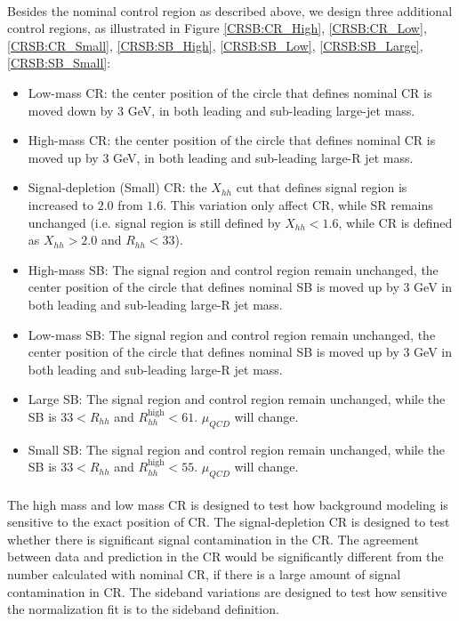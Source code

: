 \paragraph{}
Besides the nominal control region as described above, we design three additional control regions, as illustrated in Figure \ref{CRSB:CR_High}, \ref{CRSB:CR_Low}, \ref{CRSB:CR_Small}, \ref{CRSB:SB_High}, \ref{CRSB:SB_Low}, \ref{CRSB:SB_Large}, \ref{CRSB:SB_Small}:
\begin{itemize}
	\item Low-mass CR: the center position of the circle that defines nominal CR is moved down by 3 GeV, in both leading and sub-leading large-jet mass.
	\item High-mass CR: the center position of the circle that defines nominal CR is moved up by 3 GeV, in both leading and sub-leading large-R jet mass.
	\item Signal-depletion (Small) CR: the $X_{hh}$ cut that defines signal region is increased to $2.0$ from $1.6$. This variation only affect CR, while SR remains unchanged (i.e. signal region is still defined by $X_{hh}<1.6$, while CR is defined as $X_{hh}>2.0$ and $R_{hh}<33$).
	\item High-mass SB: The signal region and control region remain unchanged, the center position of the circle that defines nominal SB is moved up by 3 GeV in both leading and sub-leading large-R jet mass.
	\item Low-mass SB: The signal region and control region remain unchanged, the center position of the circle that defines nominal SB is moved up by 3 GeV in both leading and sub-leading large-R jet mass.
	\item Large SB: The signal region and control region remain unchanged, while the SB is $33 < R_{hh}$ and $ R_{hh}^{\text{high}} < 61$. $\mu_{QCD}$ will change.
	\item Small SB: The signal region and control region remain unchanged, while the SB is $33 < R_{hh}$ and $ R_{hh}^{\text{high}} < 55$. $\mu_{QCD}$ will change.
\end{itemize}

\paragraph{}
The high mass and low mass CR is designed to test how background modeling is sensitive to the exact position of CR. The signal-depletion CR is designed to test whether there is significant signal contamination in the CR. The agreement between data and prediction in the CR would be significantly different from the number calculated with nominal CR, if there is a large amount of signal contamination in CR. The sideband variations are designed to test how sensitive the normalization fit is to the sideband definition.

